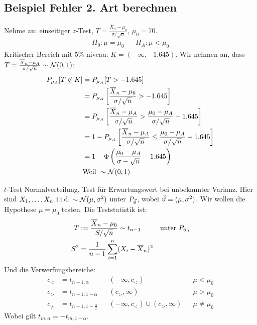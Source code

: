 \subsection{Beispiel Fehler 2. Art berechnen}
Nehme an: einseitiger $z$-Test, $T = \frac{\overline{X}_n - \mu_0}{\sigma /
    \sqrt{n}}$, $\mu_0 = 70$.
\begin{align*}
  H_0 : \mu = \mu_0 &  & H_A : \mu < \mu_0
\end{align*}
Kritischer Bereich mit $5$\% niveau: $K =  (- \infty, -1.645)$. Wir
nehmen an, dass $T = \frac{\overline{X}_n - \mu_A}{\sigma / \sqrt{n}} \sim \mathcal{N} (0, 1)$:
\begin{align*}
  P_{\mu_A}[T \not \in K]
   & = P_{\mu_A}[T > -1.645]                                                                                                            \\
   & = P_{\mu_A} \left[\frac{\overline{X}_n - \mu_0}{\sigma / \sqrt{n}} > -1.645 \right]                                                \\
   & = P_{\mu_A} \left[\frac{\overline{X}_n - \mu_A}{\sigma / \sqrt{n}} > \frac{\mu_0 - \mu_A}{\sigma / \sqrt{n}} -1.645 \right]        \\
   & = 1 - P_{\mu_A} \left[\frac{\overline{X}_n - \mu_A}{\sigma / \sqrt{n}} \leq \frac{\mu_0 - \mu_A}{\sigma / \sqrt{n}} -1.645 \right] \\
   & = 1 - \Phi \left( \frac{\mu_0 - \mu_A}{\sigma - \sqrt{n}} - 1.645 \right) \\
   & \text{Weil } \sim \mathcal{N} (0, 1)
\end{align*}
\BoxEnd{}
\begin{definition}{$t$-Test}
\color{red} Normalverteilung, Test für Erwartungswert bei unbekannter Varianz. \color{black} Hier sind
$X_1, \dots, X_n$ i.i.d. $\sim \mathcal{N} (\mu, \sigma^2)$ unter $P_{\vec{\vartheta}}$, wobei
$\vec{\vartheta} = (\mu, \sigma^2)$. Wir wollen die Hypothese $\mu = \mu_0$ testen.
Die Teststatistik ist:
\begin{align*}
  T   & := \frac{\overline{X}_n - \mu_0}{S / \sqrt{n}} \sim t_{n-1}
      &                                                             & \text{unter } P_{\vartheta_0} \\
  S^2 & = \frac{1}{n-1} \sum_{i = 1}^n  (X_i - \overline{X}_n)^2
\end{align*}
Und die Verwerfungsbereiche:
\begin{align*}
  c_<      & = t_{n-1, \alpha}               &  & (-\infty, c_<)                     &  & \mu < \mu_0    \\
  c_>      & = t_{n-1, 1 - \alpha}           &  & (c_>, \infty)                      &  & \mu > \mu_0    \\
  c_{\neq} & = t_{n-1, 1 - \frac{\alpha}{2}} &  & (-\infty, c_<) \cup  (c_>, \infty) &  & \mu \neq \mu_0
\end{align*}
Wobei gilt $t_{m, \alpha} = -t_{m, 1 - \alpha}$.
\end{definition}
